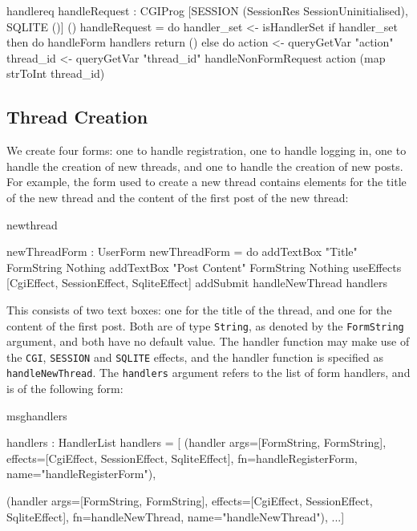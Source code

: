 \begin{SaveVerbatim}{handlereq}
 handleRequest : 
   CGIProg [SESSION (SessionRes SessionUninitialised), 
            SQLITE ()] ()
 handleRequest = do 
   handler_set <- isHandlerSet
   if handler_set then do
     handleForm handlers
     return ()
   else do
     action <- queryGetVar "action"
     thread_id <- queryGetVar "thread_id"
     handleNonFormRequest action (map strToInt thread_id)

\end{SaveVerbatim}

\subsection{Thread Creation}
We create four forms: one to handle registration, one to handle logging in,
one to handle the creation of new threads, and one to handle the creation of
new posts. For example, the form used to create a new thread
contains elements for the title of the new thread and the content of the
first post of the new thread:

\begin{SaveVerbatim}{newthread}

newThreadForm : UserForm
newThreadForm = do
  addTextBox "Title" FormString Nothing
  addTextBox "Post Content" FormString Nothing 
  useEffects [CgiEffect, SessionEffect, SqliteEffect]
  addSubmit handleNewThread handlers

\end{SaveVerbatim}

\noindent
This consists of two text boxes: one for the title of the thread, and one
for the content of the first post. Both are of type \texttt{String}, as denoted
by the \texttt{FormString} argument, and both have no default value. The
handler function may make use of the \texttt{CGI}, \texttt{SESSION} and
\texttt{SQLITE} effects, and the handler function is specified as
\texttt{handleNewThread}. The \texttt{handlers} argument refers to the list of
form handlers, and is of the following form:

\begin{SaveVerbatim}{msghandlers}

handlers : HandlerList
handlers = [
 (handler args=[FormString, FormString], 
          effects=[CgiEffect, SessionEffect, SqliteEffect], 
          fn=handleRegisterForm, 
          name="handleRegisterForm"),
  
 (handler args=[FormString, FormString], 
          effects=[CgiEffect, SessionEffect, SqliteEffect], 
          fn=handleNewThread, 
          name="handleNewThread"),
     ...]

\end{SaveVerbatim}
\noindent
{}

